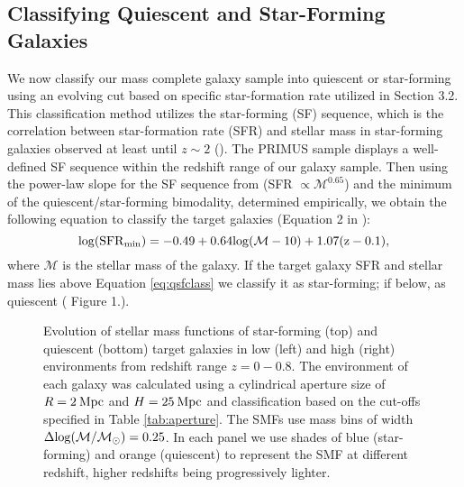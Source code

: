 \documentclass{emulateapj}
\begin{document}
\subsection{Classifying Quiescent and Star-Forming Galaxies} \label{sec:sfq}
We now classify our mass complete galaxy sample into quiescent or star-forming using an evolving cut based on specific star-formation rate utilized in \cite{Moustakas:2013aa} Section 3.2. This classification method utilizes the star-forming (SF) sequence, which is the correlation between star-formation rate (SFR) and stellar mass in star-forming galaxies observed at least until $z \sim 2$ (\cite{Noeske:2007aa}). The PRIMUS sample displays a well-defined SF sequence within the redshift range of our galaxy sample. Then using the power-law slope for the SF sequence from \cite{Salim:2007aa} (SFR $\propto \mathcal{M}^{0.65}$) and the minimum of the quiescent/star-forming bimodality, determined empirically, we obtain the following equation to classify the target galaxies (Equation 2 in \cite{Moustakas:2013aa}):
\begin{equation}
\rm{log}(\rm{SFR}_{\rm{min}}) = -0.49 + 0.64 \rm{log}(\mathcal{M} - 10) +1.07(z-0.1), 
\end{equation} \label{eq:qsfclass} 
where $\mathcal{M}$ is the stellar mass of the galaxy. If the target galaxy SFR and stellar mass lies above Equation \ref{eq:qsfclass} we classify it as star-forming; if below, as quiescent (\cite{Moustakas:2013aa} Figure 1.).

\begin{figure*}
  \begin{center}
    \leavevmode
     \caption{Evolution of stellar mass functions of star-forming (top) and quiescent (bottom) target galaxies in 
low (left) and high (right) environments from redshift range $z=0-0.8$. The environment of each galaxy  
was calculated using a cylindrical aperture size of $R=2 \: \rm{Mpc}$ and $H=25 \: \rm{Mpc}$ and  
classification based on the cut-offs specified in Table \ref{tab:aperture}. The SMFs use mass bins of 
width $\Delta \rm{log}(\mathcal{M}/\mathcal{M}_{\odot})=0.25$. In each panel we use shades of blue 
(star-forming) and orange (quiescent) to represent the SMF at different redshift, higher redshifts being
progressively lighter.}      \label{fig:smf}
    \end{center}
\end{figure*}
\end{document}
